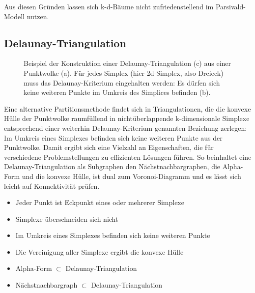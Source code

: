 Aus diesen Gründen lassen sich k-d-Bäume nicht zufriedenstellend im Parsivald-Modell nutzen.

\subsection{Delaunay-Triangulation}\label{datadelaunay}

\begin{figure}[bhpt]
  \centering
  \def\svgwidth{\textwidth}
  
  \caption[Delaunay-Triangulation]{Beispiel der Konstruktion einer Delaunay-Triangulation (c) aus einer Punktwolke (a).
    Für jedes Simplex (hier 2d-Simplex, also Dreieck) muss das Delaunay-Kriterium eingehalten werden:
    Es dürfen sich keine weiteren Punkte im Umkreis des Simplices befinden (b).
  }
  \label{fig:delaunay}
\end{figure}

Eine alternative Partitionsmethode findet sich in Triangulationen, die die konvexe Hülle der Punktwolke raumfüllend in nichtüberlappende k-dimensionale Simplexe entsprechend einer weiterhin Delaunay-Kriterium genannten Beziehung zerlegen:
Im Umkreis eines Simplexes befinden sich keine weiteren Punkte aus der Punktwolke.
Damit ergibt sich eine Vielzahl an Eigenschaften, die für verschiedene Problemstellungen zu effizienten Lösungen führen.
So beinhaltet eine Delaunay-Triangulation als Subgraphen den Nächstnachbargraphen, die Alpha-Form und die konvexe Hülle, ist dual zum Voronoi-Diagramm und es lässt sich leicht auf Konnektivität prüfen.


\begin{itemize}
\item Jeder Punkt ist Eckpunkt eines oder mehrerer Simplexe
\item Simplexe überschneiden sich nicht
\item Im Umkreis eines Simplexes befinden sich keine weiteren Punkte
\item Die Vereinigung aller Simplexe ergibt die konvexe Hülle
\item Alpha-Form $\subset$ Delaunay-Triangulation
\item %
  Nächstnachbargraph $\subset$ Delaunay-Triangulation
\end{itemize}

